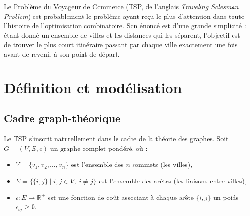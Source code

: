 \documentclass[12pt, a4paper, twoside, openright]{book}
\newcommand{\R}{\mathbb{R}}
\begin{document}
Le Problème du Voyageur de Commerce (TSP, de l'anglais \textit{Traveling Salesman Problem}) est probablement le problème ayant reçu le plus d'attention dans toute l'histoire de l'optimisation combinatoire. Son énoncé est d'une grande simplicité : étant donné un ensemble de villes et les distances qui les séparent, l'objectif est de trouver le plus court itinéraire passant par chaque ville exactement une fois avant de revenir à son point de départ.
	
	\section{D\'efinition et mod\'elisation}
	\label{sec:tsp_definition}
	
	\subsection{Cadre graph-th\'eorique}
	\label{subsec:cadre_graphe}
	
	Le TSP s'inscrit naturellement dans le cadre de la théorie des graphes.
	Soit $G = (V, E, c)$ un graphe complet pondéré, où :
	\begin{itemize}
		\item $V = \{v_1, v_2, \ldots, v_n\}$ est l'ensemble des $n$ sommets
		(les villes),
		\item $E = \{\{i,j\} \mid i,j \in V,\; i \neq j\}$ est l'ensemble des
		arêtes (les liaisons entre villes),
		\item $c : E \to \R^+$ est une fonction de coût associant à chaque arête
		$\{i,j\}$ un poids $c_{ij} \geq 0$.
	\end{itemize}
	
	\newcommand{\grapheComplet}[2]{%
		\begin{tikzpicture}[scale=0.6]
			\foreach \i in {1,...,#1} {
				\foreach \j in {1,...,#1} {
					\ifnum\i<\j
					\draw[ThBlue!40, line width=0.5pt]
					({#2+(\i-1)*360/#1}:1.1cm) --
					({#2+(\j-1)*360/#1}:1.1cm);
					\fi
				}
			}
			\foreach \i in {1,...,#1} {
				\node[circle, fill=ThBlue, draw=white,
				line width=0.8pt, inner sep=1.5pt,
				label={[font=\tiny, color=ThBlue, inner sep=1pt]
					{#2+(\i-1)*360/#1}:$v_{\i}$}]
				at ({#2+(\i-1)*360/#1}:1.1cm) {};
			}
		\end{tikzpicture}%
	}
	
\end{document}
